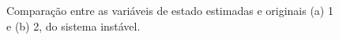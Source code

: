 \begin{figure}[H]
\begin{center}
\end{center}
\caption{Comparação entre as variáveis de estado estimadas e originais (a) 1 e (b) 2, do sistema instável.}
\label{obs:ins:x} 
\end{figure}

